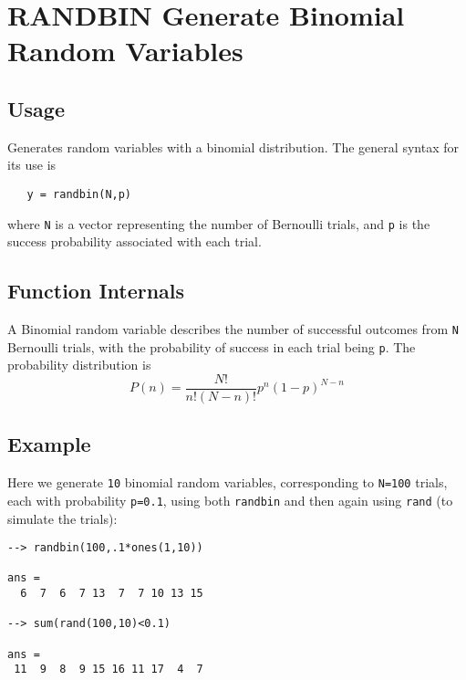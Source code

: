 \section{RANDBIN Generate Binomial Random Variables}

\subsection{Usage}

Generates random variables with a binomial distribution.
The general syntax for its use is
\begin{verbatim}
   y = randbin(N,p)
\end{verbatim}
where \verb|N| is a vector representing the number of Bernoulli
trials, and \verb|p| is the success probability associated with each
trial.
\subsection{Function Internals}

A Binomial random variable describes the number of successful
outcomes from \verb|N| Bernoulli trials, with the probability of
success in each trial being \verb|p|.  The probability distribution
is
\[
   P(n) = \frac{N!}{n!(N-n)!}p^n(1-p)^{N-n}
\]
\subsection{Example}

Here we generate \verb|10| binomial random variables, corresponding
to \verb|N=100| trials, each with probability \verb|p=0.1|, using
both \verb|randbin| and then again using \verb|rand| (to simulate the trials):
\begin{verbatim}
--> randbin(100,.1*ones(1,10))

ans = 
  6  7  6  7 13  7  7 10 13 15 

--> sum(rand(100,10)<0.1)

ans = 
 11  9  8  9 15 16 11 17  4  7 
\end{verbatim}

